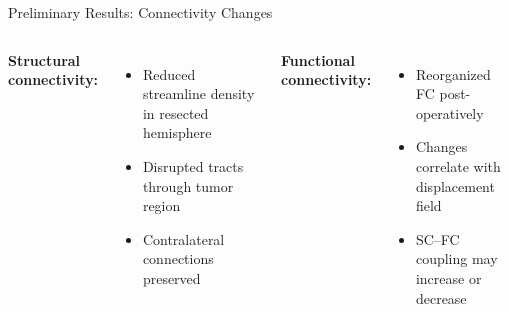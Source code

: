 \begin{frame}{Preliminary Results: Connectivity Changes}

  \begin{columns}[T]
    \textbf{Structural connectivity:}
    \begin{itemize}
      \item Reduced streamline density in resected hemisphere
      \item Disrupted tracts through tumor region
      \item Contralateral connections preserved
    \end{itemize}

    \textbf{Functional connectivity:}
    \begin{itemize}
      \item Reorganized FC post-operatively
      \item Changes correlate with displacement field
      \item SC--FC coupling may increase or decrease
    \end{itemize}
  \end{columns}

  \bigskip

  \begin{center}
  \end{center}

\end{frame}

